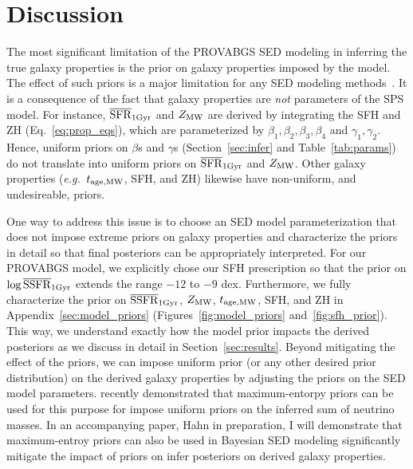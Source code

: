 \section{Discussion} \label{sec:discuss}
The most significant limitation of the {\sc PROVABGS} SED modeling in
inferring the true galaxy properties is the prior on galaxy properties imposed
by the model. 
The effect of such priors is  a major limitation for any SED modeling
methods~\citep{carnall2017, leja2019}. 
It is a consequence of the fact that galaxy properties are \emph{not}
parameters of the SPS model.
For instance, $\overline{\rm SFR}_{\rm 1Gyr}$ and $Z_{\rm MW}$ are derived by integrating the SFH and ZH
(Eq.~\ref{eq:prop_eqs}), which are parameterized by $\beta_1, \beta_2, \beta_3,
\beta_4$ and $\gamma_1, \gamma_2$. 
Hence, uniform priors on $\beta$s and $\gamma$s (Section~\ref{sec:infer} and
Table~\ref{tab:params}) do not translate into uniform priors on $\overline{\rm SFR}_{\rm 1Gyr}$ and
$Z_{\rm MW}$.
Other galaxy properties (\emph{e.g.}~$t_{\rm age, MW}$, SFH, and ZH) likewise have
non-uniform, and undesireable, priors. 

One way to address this issue is to choose an SED model parameterization that
does not impose extreme priors on galaxy properties and characterize the priors
in detail so that final posteriors can be appropriately interpreted. 
For our {\sc PROVABGS} model, we explicitly chose our SFH prescription so that
the prior on $\log\overline{\rm SSFR}_{\rm 1Gyr}$ extends the range $-12$ to $-9$ dex.
Furthermore, we fully characterize the prior on $\overline{\rm SSFR}_{\rm 1Gyr}$, $Z_{\rm MW}$, $t_{\rm age, MW}$,
SFH, and ZH in Appendix~\ref{sec:model_priors} (Figures~\ref{fig:model_priors}
and~\ref{fig:sfh_prior}). 
This way, we understand exactly how the model prior impacts the derived
posteriors as we discuss in detail in Section~\ref{sec:results}. 
Beyond mitigating the effect of the priors, we can impose uniform prior (or any
other desired prior distribution) on the derived galaxy properties by adjusting
the priors on the SED model parameters. 
\cite{handley2019} recently demonstrated that maximum-entorpy priors can be
used for this purpose for impose uniform priors on the inferred sum of neutrino
masses. 
In an accompanying paper, Hahn in preparation, I will demonstrate that
maximum-entroy priors can also be used in Bayesian SED modeling significantly
mitigate the impact of priors on infer posteriors on derived galaxy properties. 


